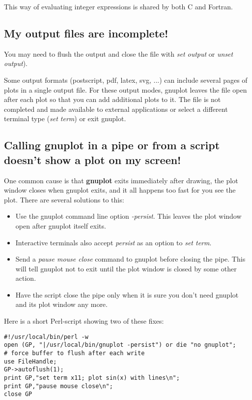 \documentclass[a4paper,11pt]{article}
\newcommand{\gnuplot}{\textbf{gnuplot }}
\begin{document}
This way of evaluating integer expressions is shared by both C and Fortran.


\subsection{My output files are incomplete!}

You may need to flush the output and close the file with
{\em set output} or {\em unset output}).

Some output formats (postscript, pdf, latex, svg, ...) can include several
pages of plots in a single output file.  For these output modes, gnuplot
leaves the file open after each plot so that you can add additional plots
to it.  The file is not completed and made available to external applications
or select a different terminal type ({\em set term}) or exit gnuplot.


\subsection{Calling gnuplot in a pipe or from a script doesn't show a plot on my screen!}

One common cause is that \gnuplot exits immediately after drawing,
the plot window closes when gnuplot exits, and it all happens too fast
for you see the plot.
There are several solutions to this:
\begin{itemize}
\item  Use the gnuplot command line option {\em -persist}.
       This leaves the plot window open after gnuplot itself exits.
\item  Interactive terminals also accept {\em persist} as an option to {\em set term}.
\item  Send a {\em pause mouse close} command to gnuplot before closing the pipe.
       This will tell gnuplot not to exit until the plot window is closed by
       some other action.
\item  Have the script close the pipe only when it is sure you don't need
       gnuplot and its plot window any more.
\end{itemize}

Here is a short Perl-script showing two of these fixes:
\small
\begin{verbatim}
#!/usr/local/bin/perl -w
open (GP, "|/usr/local/bin/gnuplot -persist") or die "no gnuplot";
# force buffer to flush after each write
use FileHandle;
GP->autoflush(1);
print GP,"set term x11; plot sin(x) with lines\n";
print GP,"pause mouse close\n";
close GP
\end{verbatim}
\normalsize
\end{document}
